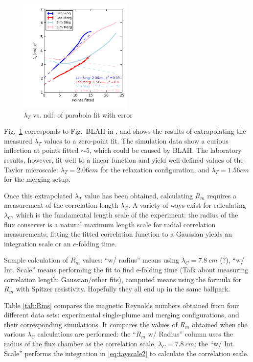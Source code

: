 \documentclass[aip,prl,amsmath,amssymb,reprint,superscriptaddress]{revtex4-1} %
\begin{document}
\begin{figure}[!htbp]
\centerline{
\includegraphics[width=0.5\textwidth]{Images/ndf.png}}
\caption{\label{fig:ndf} $\lambda_T$ vs. ndf. of parabola fit with error}
\end{figure}

Fig.\ \ref{fig:ndf} corresponds to Fig.\ BLAH in \cite{Matthaeus05}, and shows the results of extrapolating the measured $\lambda_T$ values to a zero-point fit. The simulation data show a curious inflection at points fitted $\sim 5$, which could be caused by BLAH. The laboratory results, however, fit well to a linear function and yield well-defined values of the Taylor microscale: $\lambda_T = 2.06cm$ for the relaxation configuration, and $\lambda_T = 1.56cm$ for the merging setup. 

Once this extrapolated $\lambda_T$ value has been obtained, calculating $R_m$ requires a measurement of the correlation length $\lambda_C$. A variety of ways exist for calculating $\lambda_C$, which is the fundamental length scale of the experiment: the radius of the flux conserver is a natural maximum length scale for radial correlation measurements; fitting the fitted correlation function to a Gaussian yields an integration scale or an $e$-folding time. 

\textsf{Sample calculation of $R_m$ values: ``w/ radius'' means using $\lambda_C = 7.8\ cm$ (?), ``w/ Int. Scale'' means performing the fit to find e-folding time (Talk about measuring correlation length: Gaussian/other fits), computed means using the formula for $R_m$ with Spitzer resistivity. Hopefully they all end up in the same ballpark. }

Table \ref{tab:Rms} compares the magnetic Reynolds numbers obtained from four different data sets: experimental single-plume and merging configurations, and their corresponding simulations. It compares the values of $R_m$ obtained when the various $\lambda_C$ calculations are performed: the ``$R_m$ w/ Radius'' column uses the radius of the flux chamber as the correlation scale, $\lambda_C = 7.8\ cm$; the ``w/ Int. Scale'' performs the integration in \eqref{eq:tayscale2} to calculate the correlation scale. 
\end{document}
